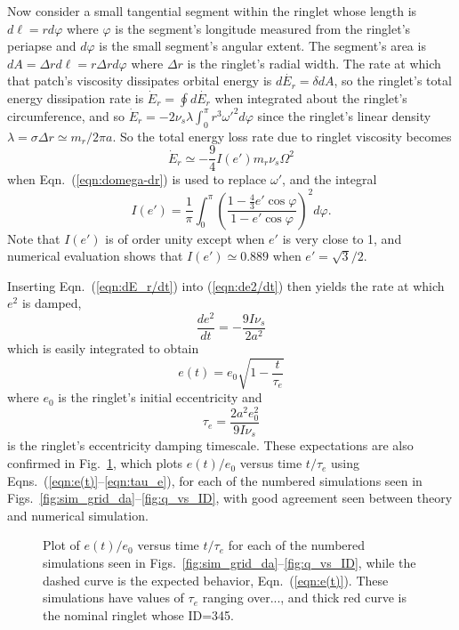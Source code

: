 \documentclass[preprint]{aastex62}
\begin{document}
Now consider a small tangential segment within the ringlet whose length is $d\ell=rd\varphi$ where 
$\varphi$ is the segment's longitude measured from the ringlet's periapse and
$d\varphi$ is the small segment's angular extent. The segment's area is 
$dA=\Delta rd\ell=r\Delta r d\varphi$
where $\Delta r$ is the ringlet's radial width.
The rate at which that patch's viscosity dissipates orbital energy is $d\dot{E_r}=\delta dA$, so
the ringlet's total energy dissipation rate is 
$\dot{E}_r = \oint d\dot{E_r}$ when integrated about the ringlet's circumference, and so
$\dot{E}_r = -2\nu_s\lambda\int_0^\pi r^3\omega'^2d\varphi$
since the ringlet's linear density $\lambda=\sigma\Delta r\simeq m_r/2\pi a$. So the
total energy loss rate due to ringlet viscosity becomes
\begin{equation}
    \label{eqn:dE_r/dt}
    \dot{E}_r \simeq -\frac{9}{4}I(e')m_r\nu_s\Omega^2
\end{equation}
when Eqn.\ (\ref{eqn:domega-dr}) is used to replace $\omega'$, and the integral 
\begin{equation}
    I(e') =  \frac{1}{\pi}\int_0^\pi\left(\frac{1-\frac{4}{3}e'\cos\varphi}{1-e'\cos\varphi}\right)^2d\varphi .
\end{equation}
Note that  $I(e')$ is of order
unity except when $e'$ is very close to 1, and numerical evaluation shows that $I(e')\simeq0.889$
when $e'=\sqrt{3}/2$.

Inserting Eqn.\ (\ref{eqn:dE_r/dt}) into (\ref{eqn:de2/dt}) then yields the rate at which $e^2$
is damped,
\begin{equation}
    \label{eqn:de2/dt_v2}
    \frac{de^2}{dt} = -\frac{9I\nu_s}{2a^2}
\end{equation}
which is easily integrated to obtain
\begin{equation}
    \label{eqn:e(t)}
    e(t) = e_0\sqrt{1-\frac{t}{\tau_e}}
\end{equation}
where $e_0$ is the ringlet's initial eccentricity and
\begin{equation}
    \label{eqn:tau_e}
    \tau_e = \frac{2a^2e_0^2}{9I\nu_s}
\end{equation}
is the ringlet's eccentricity damping timescale.
These expectations are also confirmed in Fig.\ \ref{fig:e_vs_tau_e}, which plots
$e(t)/e_0$ versus time $t/\tau_e$ using Eqns.\ (\ref{eqn:e(t)}--\ref{eqn:tau_e}),
for each of the numbered simulations seen in Figs.\ \ref{fig:sim_grid_da}--\ref{fig:q_vs_ID},
with good agreement seen between theory and numerical simulation.
\begin{figure}
    \caption{
        \label{fig:e_vs_tau_e}
        Plot of $e(t)/e_0$ versus time $t/\tau_e$ for each of the 
        numbered simulations seen in Figs.\ \ref{fig:sim_grid_da}--\ref{fig:q_vs_ID},
        while the dashed curve is the expected behavior, Eqn.\ (\ref{eqn:e(t)}).
        These simulations have values of $\tau_e$ ranging over...,
        and thick red curve is the nominal ringlet whose ID=345.
    }
\end{figure}
\end{document}

